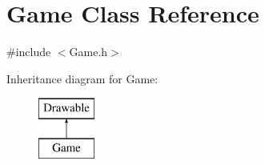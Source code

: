 \hypertarget{class_game}{}\section{Game Class Reference}
\label{class_game}


{\ttfamily \#include $<$Game.\+h$>$}

Inheritance diagram for Game\+:\begin{figure}[H]
\begin{center}
\leavevmode
\includegraphics[height=2.000000cm]{class_game}
\end{center}
\end{figure}
